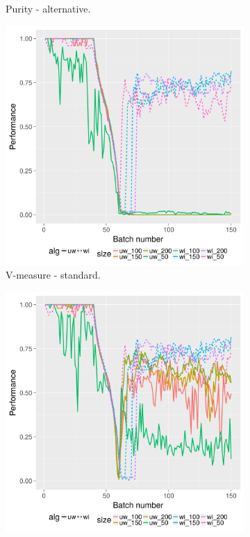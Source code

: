 \begin{figure}[H]
\begin{subfigure}[b]{0.47\textwidth}
                \caption{Purity - alternative.}
                \label{fig:pa_4849}
        \end{subfigure}
        \begin{subfigure}[b]{0.47\textwidth}
          \includegraphics[width=\textwidth]{standard_alt/evolving_pen_48_49_standard_vmeasure.png}
                 \caption{V-measure - standard.}
                 \label{fig:vs_4849}
        \end{subfigure}
        \begin{subfigure}[b]{0.47\textwidth}
                 \includegraphics[width=\textwidth]{standard_alt/evolving_pen_48_49_alternative_vmeasure.png}

\end{subfigure}
\end{figure}
